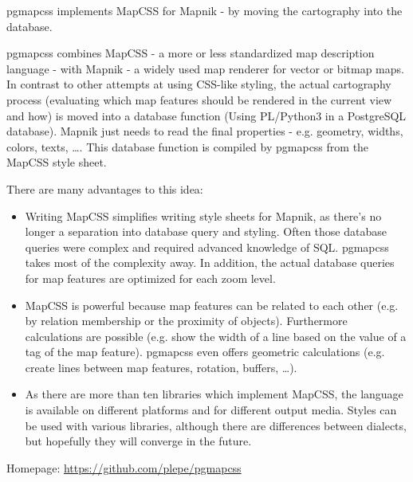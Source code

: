 %
{pgmapcss implements MapCSS for Mapnik - by moving the cartography into the database.}%
{}%
{pgmapcss combines MapCSS - a more or less standardized map description language - with Mapnik - a widely used map renderer for vector or bitmap maps. In contrast to other attempts at using CSS-like styling, the actual cartography process (evaluating which map features should be rendered  in the current view and how) is moved into a database function (Using PL/Python3 in a PostgreSQL database). Mapnik just needs to read the final properties - e.g. geometry, widths, colors, texts, …. This database function is compiled by pgmapcss from the MapCSS style sheet.

\noindent There are many advantages to this idea:
\begin{itemize}
\item Writing MapCSS simplifies writing style sheets for Mapnik, as there's no longer a separation into database query and styling. Often those database queries were complex and required advanced knowledge of SQL. pgmapcss takes most of the complexity away. In addition, the actual database queries for map features are optimized for each zoom level.
\item MapCSS is powerful because map features can be related to each other (e.g. by relation membership or the proximity of objects). Furthermore calculations are possible (e.g. show the width of a line based on the value of a tag of the map feature). pgmapcss even offers geometric calculations (e.g. create lines between map features, rotation, buffers, …).
\item As there are more than ten libraries which implement MapCSS, the language is available on different platforms and for different output media. Styles can be used with various libraries,  although there are differences between dialects, but hopefully they will converge in the future.
\end{itemize}

Homepage: \url{https://github.com/plepe/pgmapcss}}


